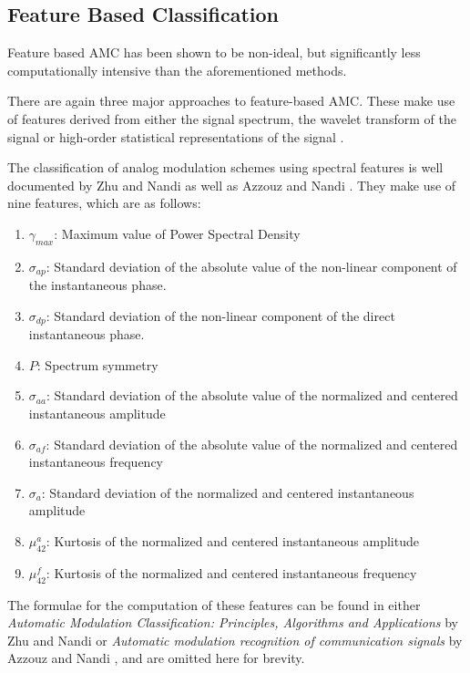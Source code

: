 \documentclass[10pt,onecolumn]{witseiepaper}
\begin{document}
\begin{multicols}{2}
	\subsection{Feature Based Classification}
	\label{sec:features}
	Feature based AMC has been shown to be non-ideal, but significantly less computationally intensive \cite{zhu2014automatic} than the aforementioned methods.

	There are again three major approaches to feature-based AMC. These make use of features derived from either the signal spectrum, the wavelet transform of the signal or high-order statistical representations of the signal \cite{zhu2014automatic}. 
	
	The classification of analog modulation schemes using spectral features is well documented by Zhu and Nandi \cite{zhu2014automatic} as well as Azzouz and Nandi \cite{azzouz2013automatic}. They make use of nine features, which are as follows:

	\begin{enumerate}
		\item $\gamma_{max}$: Maximum value of Power Spectral Density 
		\item $\sigma_{ap}$: Standard deviation of the absolute value of the non-linear component of the instantaneous phase.
		\item $\sigma_{dp}$: Standard deviation of the non-linear component of the direct instantaneous phase.
		\item $P$: Spectrum symmetry
		\item $\sigma_{aa}$: Standard deviation of the absolute value of the normalized and centered instantaneous amplitude
		\item $\sigma_{af}$: Standard deviation of the absolute value of the normalized and centered instantaneous frequency
		\item $\sigma_{a}$: Standard deviation of the normalized and centered instantaneous amplitude
		\item $\mu_{42}^{a}$: Kurtosis of the normalized and centered instantaneous amplitude
		\item $\mu_{42}^{f}$: Kurtosis of the normalized and centered instantaneous frequency
	\end{enumerate}

	The formulae for the computation of these features can be found in either \textit{Automatic Modulation Classification: Principles, Algorithms and Applications} by Zhu and Nandi \cite{zhu2014automatic} or \textit{Automatic modulation recognition of communication signals} by Azzouz and Nandi \cite{azzouz2013automatic}, and are omitted here for brevity.
	

\end{multicols}
\end{document}
